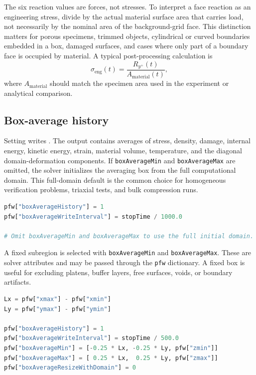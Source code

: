 The six reaction values are forces, not stresses.  To interpret a face reaction as an engineering stress, divide by the actual material surface area that carries load, not necessarily by the nominal area of the background-grid face.  This distinction matters for porous specimens, trimmed objects, cylindrical or curved boundaries embedded in a box, damaged surfaces, and cases where only part of a boundary face is occupied by material.  A typical post-processing calculation is
\begin{equation}
  \sigma_{\mathrm{eng}}(t) = \frac{R_{y^+}(t)}{A_{\mathrm{material}}(t)},
\end{equation}
where \(A_{\mathrm{material}}\) should match the specimen area used in the experiment or analytical comparison.

\subsection{Box-average history}
\label{subsec:pfw-box-average-history}

Setting  writes .  The output contains averages of stress, density, damage, internal energy, kinetic energy, strain, material volume, temperature, and the diagonal domain-deformation components.  If \texttt{boxAverageMin} and \texttt{boxAverageMax} are omitted, the solver initializes the averaging box from the full computational domain.  This full-domain default is the common choice for homogeneous verification problems, triaxial tests, and bulk compression runs.

\begin{lstlisting}[language=Python,caption={Full-domain box-average history.}]
pfw["boxAverageHistory"] = 1
pfw["boxAverageWriteInterval"] = stopTime / 1000.0

# Omit boxAverageMin and boxAverageMax to use the full initial domain.
\end{lstlisting}

A fixed subregion is selected with \texttt{boxAverageMin} and \texttt{boxAverageMax}.  These are solver attributes and may be passed through the \texttt{pfw} dictionary.  A fixed box is useful for excluding platens, buffer layers, free surfaces, voids, or boundary artifacts.

\begin{lstlisting}[language=Python,caption={Fixed Eulerian sub-box average.}]
Lx = pfw["xmax"] - pfw["xmin"]
Ly = pfw["ymax"] - pfw["ymin"]

pfw["boxAverageHistory"] = 1
pfw["boxAverageWriteInterval"] = stopTime / 500.0
pfw["boxAverageMin"] = [-0.25 * Lx, -0.25 * Ly, pfw["zmin"]]
pfw["boxAverageMax"] = [ 0.25 * Lx,  0.25 * Ly, pfw["zmax"]]
pfw["boxAverageResizeWithDomain"] = 0
\end{lstlisting}

